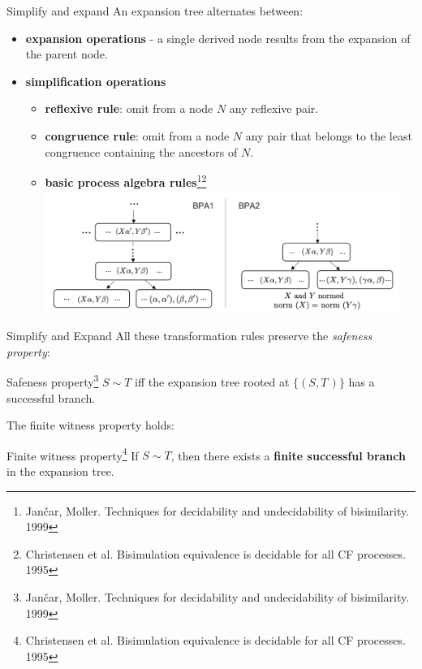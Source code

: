 \message{ !name(main.tex)}\documentclass[10pt]{beamer}
\begin{document}
\begin{frame} {Simplify and expand}
	An expansion tree alternates between:
	\vspace*{-1mm}
	\begin{itemize} 
		\item {\color{mLightBrown} \bf expansion operations} - a single derived node results from the expansion of the parent node. \pause
		\item {\color{teal}\bf simplification operations	}
		\begin{itemize}
			\item {\bf reflexive rule}: omit from a node $N$ any reflexive pair.
			\item {\bf congruence rule}: omit from a node $N$ any pair that belongs to the least congruence containing the ancestors of $N$. \pause
			\item {\bf basic process algebra rules}\footnote{Jan{\v{c}}ar, Moller. Techniques for decidability and undecidability of bisimilarity. 1999}\footnote{ Christensen et al. Bisimulation equivalence is decidable for all CF processes. 1995}\\
			\vspace*{-2mm}
			\hspace*{-2cm}\includegraphics[height=4cm]{img/bpa_new}\smallskip
		\end{itemize}
	\end{itemize}
\end{frame}

\begin{frame}{Simplify and Expand}
	All these transformation rules preserve the \emph{safeness property}:
	\begin{block}{Safeness property\footnote{Jan{\v{c}}ar, Moller. Techniques for decidability and undecidability of bisimilarity. 1999}}
		\smallskip
		$S\sim T$ iff the expansion tree rooted at $\{(S,T\,)\}$ has a successful branch.	
	\end{block}
	
	The finite witness property holds\footnotemark[\value{footnote}]:
	
	\begin{block}{Finite witness property\footnotemark[\value{footnote}]\footnote{ Christensen et al. Bisimulation equivalence is decidable for all CF processes. 1995}}
		\smallskip
		If $S\sim T$, then there exists a {\bf finite successful branch} in the expansion tree.
	\end{block}
\end{frame}
\end{document}
